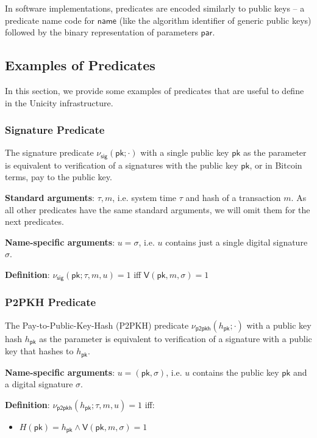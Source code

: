 \documentclass{article}
\newcommand{\sigver}[0]{\mathsf{V}}
\newcommand{\pubkey}[0]{\mathsf{pk}}
\begin{document}
\noindent
In software implementations, predicates are encoded similarly to public keys -- a predicate name code for $\mathsf{name}$ (like the algorithm identifier of generic public keys) followed by the binary representation of parameters $\mathsf{par}$.


\subsection{Examples of Predicates}
In this section, we provide some examples of predicates that are useful to define in the Unicity infrastructure.

\subsubsection{Signature Predicate}

The signature predicate  $\nu_\mathsf{sig}(\pubkey;\cdot)$ with a single public key $\pubkey$ as the parameter is equivalent to verification of a signatures with the public key $\pubkey$, or in Bitcoin terms, pay to the public key.
\medskip

\noindent\textbf{Standard arguments}: $\tau,m$, i.e. system time $\tau$ and hash of a transaction $m$. As all other predicates have the same standard arguments, we will omit them for the next predicates.\medskip

\noindent\textbf{Name-specific arguments}: $u=\sigma$, i.e. $u$ contains just a single digital signature $\sigma$.\medskip

\noindent\textbf{Definition}: $\nu_\mathsf{sig}(\pubkey;\tau,m,u)=1$ iff $\sigver(\pubkey,m,\sigma)=1$


\subsubsection{P2PKH Predicate}

The Pay-to-Public-Key-Hash (P2PKH) predicate $\nu_\mathsf{p2pkh}(h_\mathsf{pk};\cdot)$ with a public key hash $h_\mathsf{pk}$ as the parameter is equivalent to verification of a signature with a public key that hashes to $h_\mathsf{pk}$.
\medskip

\noindent\textbf{Name-specific arguments}: $u=(\pubkey, \sigma)$, i.e. $u$ contains the public key $\pubkey$ and a digital signature $\sigma$.\medskip

\noindent\textbf{Definition}: $\nu_\mathsf{p2pkh}(h_\mathsf{pk};\tau,m,u)=1$ iff:
\begin{itemize}
\item $H(\pubkey)=h_\mathsf{pk} \mathrel{\land} \sigver(\pubkey,m,\sigma)=1$
\end{itemize}
\end{document}
